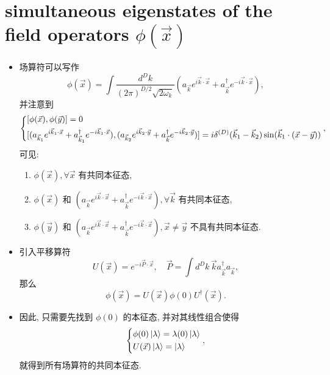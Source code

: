 \documentclass[10pt, a4paper]{article}
\numberwithin{equation}{section}
\begin{document}
	\section{simultaneous eigenstates of the field operators \texorpdfstring{$\phi(\vec{x})$}{phi(x)}}
	\begin{itemize}
		\item 场算符可以写作
		\begin{equation}
			\phi(\vec{x}) = \int \frac{d^D k}{(2 \pi)^{D / 2} \sqrt{2 \omega_k}} (a_{\vec{k}} e^{i \vec{k} \cdot \vec{x}} + a^\dag_{\vec{k}} e^{- i \vec{k} \cdot \vec{x}}),
		\end{equation}
		并注意到
		\begin{equation}
			\begin{dcases}
				[\phi(\vec{x}), \phi(\vec{y})] = 0 \\
				[(a_{\vec{k}_1} e^{i \vec{k}_1 \cdot \vec{x}} + a^\dag_{\vec{k}_1} e^{- i \vec{k}_1 \cdot \vec{x}}), (a_{\vec{k}_2} e^{i \vec{k}_2 \cdot \vec{y}} + a^\dag_{\vec{k}} e^{- i \vec{k}_2 \cdot \vec{y}})] = i \delta^{(D)}(\vec{k}_1 - \vec{k}_2) \sin(\vec{k}_1 \cdot (\vec{x} - \vec{y}))
			\end{dcases},
		\end{equation}
		可见:
		\begin{enumerate}
			\item $\phi(\vec{x}), \forall \vec{x}$ 有共同本征态,
			
			\item $\phi(\vec{x})$ 和 $(a_{\vec{k}} e^{i \vec{k} \cdot \vec{x}} + a^\dag_{\vec{k}} e^{- i \vec{k} \cdot \vec{x}}), \forall \vec{k}$ 有共同本征态,
			
			\item $\phi(\vec{y})$ 和 $(a_{\vec{k}} e^{i \vec{k} \cdot \vec{x}} + a^\dag_{\vec{k}} e^{- i \vec{k} \cdot \vec{x}}), \vec{x} \neq \vec{y}$ 不具有共同本征态.
		\end{enumerate}
		
		\item 引入平移算符
		\begin{equation}
			U(\vec{x}) = e^{- i \vec{P} \cdot \vec{x}}, \quad \vec{P} = \int d^D k \, \vec{k} a^\dag_{\vec{k}} a_{\vec{k}},
		\end{equation}
		那么
		\begin{equation}
			\phi(\vec{x}) = U(\vec{x}) \phi(0) U^\dag(\vec{x}).
		\end{equation}
		
		\item 因此, 只需要先找到 $\phi(0)$ 的本征态, 并对其线性组合使得
		\begin{equation}
			\begin{dcases}
				\phi(0) \ket{\lambda} = \lambda(0) \ket{\lambda} \\
				U(\vec{x}) \ket{\lambda} = \ket{\lambda}
			\end{dcases},
		\end{equation}
		就得到所有场算符的共同本征态.
	\end{itemize}
	
\end{document}
